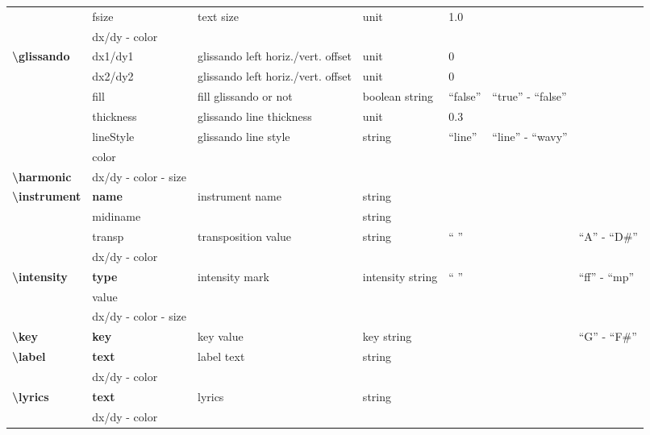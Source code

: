 \documentclass[a4paper, landscape, 10pt]{article}
\begin{document}
\begin{tabularx}{\linewidth}{p{3cm}p{3cm}p{5cm}p{3cm}p{2cm}p{3.5cm}p{4cm}}
    &fsize&text size&unit&1.0&&\\
    &dx/dy - color&&&&&\\
    \hline
    \textbf{\textbackslash{}glissando}&dx1/dy1&glissando left horiz./vert. offset&unit&0&&\\
    &dx2/dy2&glissando left horiz./vert. offset&unit&0&&\\
    &fill&fill glissando or not&boolean string&``false''&``true'' - ``false''&\\
    &thickness&glissando line thickness&unit&0.3&&\\
    &lineStyle&glissando line style&string&``line''&``line'' - ``wavy''&\\ %
    &color&&&&&\\
    \hline
	\textbf{\textbackslash{}harmonic}&dx/dy - color - size&&&&&\\
	\hline
    \textbf{\textbackslash{}instrument}&\textbf{name}&instrument name&string&&&\\
    &midiname&&string&&&\\ %
    &transp&transposition value&string&`` ''&&``A'' - ``D\#''\\
    &dx/dy - color&&&&&\\
    \hline
    \textbf{\textbackslash{}intensity}&\textbf{type}&intensity mark&intensity string&`` ''&&``ff'' - ``mp''\\
    &value&&&&&\\ %
    &dx/dy - color - size&&&&&\\
    \hline
    \textbf{\textbackslash{}key}&\textbf{key}&key value&key string&&&``G'' - ``F\#''\\
    \hline
    \textbf{\textbackslash{}label}&\textbf{text}&label text&string&&&\\
    &dx/dy - color&&&&&\\
    \hline
    \textbf{\textbackslash{}lyrics}&\textbf{text}&lyrics&string&&&\\
    &dx/dy - color&&&&&\\
    \hline
\end{tabularx}
\end{document}
